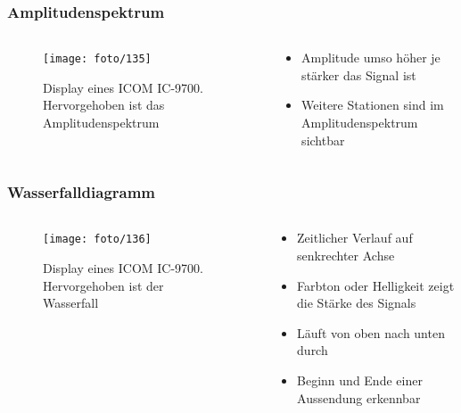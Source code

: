 \begin{frame}
\frametitle{Amplitudenspektrum}
\begin{columns}
    \begin{column}{0.48\textwidth}
    
\begin{figure}
    \texttt{[image: foto/135]}
    \caption{\scriptsize Display eines ICOM IC-9700. Hervorgehoben ist das Amplitudenspektrum}
    \label{n_wasserfall_amplitudenspektrum}
\end{figure}

    \end{column}
   \begin{column}{0.48\textwidth}
       \begin{itemize}
  \item Amplitude umso höher je stärker das Signal ist
  \item Weitere Stationen sind im Amplitudenspektrum sichtbar
  \end{itemize}

   \end{column}
\end{columns}

\end{frame}

\begin{frame}
\frametitle{Wasserfalldiagramm}
\begin{columns}
    \begin{column}{0.48\textwidth}
    
\begin{figure}
    \texttt{[image: foto/136]}
    \caption{\scriptsize Display eines ICOM IC-9700. Hervorgehoben ist der Wasserfall}
    \label{n_wasserfall_wasserfall}
\end{figure}

    \end{column}
   \begin{column}{0.48\textwidth}
       \begin{itemize}
  \item Zeitlicher Verlauf auf senkrechter Achse
  \item Farbton oder Helligkeit zeigt die Stärke des Signals
  \item Läuft von oben nach unten durch
  \item Beginn und Ende einer Aussendung erkennbar
  \end{itemize}

   \end{column}
\end{columns}

\end{frame}

